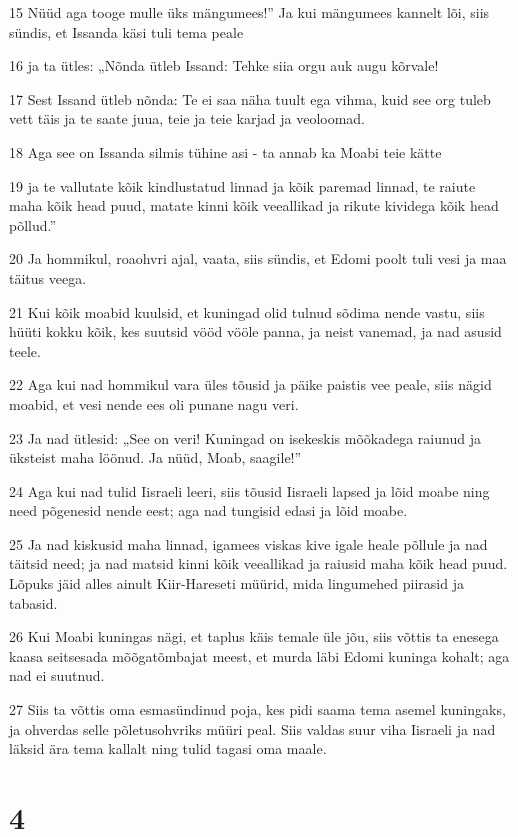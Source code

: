 \par 15 Nüüd aga tooge mulle üks mängumees!” Ja kui mängumees kannelt lõi, siis sündis, et Issanda käsi tuli tema peale
\par 16 ja ta ütles: „Nõnda ütleb Issand: Tehke siia orgu auk augu kõrvale!
\par 17 Sest Issand ütleb nõnda: Te ei saa näha tuult ega vihma, kuid see org tuleb vett täis ja te saate juua, teie ja teie karjad ja veoloomad.
\par 18 Aga see on Issanda silmis tühine asi - ta annab ka Moabi teie kätte
\par 19 ja te vallutate kõik kindlustatud linnad ja kõik paremad linnad, te raiute maha kõik head puud, matate kinni kõik veeallikad ja rikute kividega kõik head põllud.”
\par 20 Ja hommikul, roaohvri ajal, vaata, siis sündis, et Edomi poolt tuli vesi ja maa täitus veega.
\par 21 Kui kõik moabid kuulsid, et kuningad olid tulnud sõdima nende vastu, siis hüüti kokku kõik, kes suutsid vööd vööle panna, ja neist vanemad, ja nad asusid teele.
\par 22 Aga kui nad hommikul vara üles tõusid ja päike paistis vee peale, siis nägid moabid, et vesi nende ees oli punane nagu veri.
\par 23 Ja nad ütlesid: „See on veri! Kuningad on isekeskis mõõkadega raiunud ja üksteist maha löönud. Ja nüüd, Moab, saagile!”
\par 24 Aga kui nad tulid Iisraeli leeri, siis tõusid Iisraeli lapsed ja lõid moabe ning need põgenesid nende eest; aga nad tungisid edasi ja lõid moabe.
\par 25 Ja nad kiskusid maha linnad, igamees viskas kive igale heale põllule ja nad täitsid need; ja nad matsid kinni kõik veeallikad ja raiusid maha kõik head puud. Lõpuks jäid alles ainult Kiir-Hareseti müürid, mida lingumehed piirasid ja tabasid.
\par 26 Kui Moabi kuningas nägi, et taplus käis temale üle jõu, siis võttis ta enesega kaasa seitsesada mõõgatõmbajat meest, et murda läbi Edomi kuninga kohalt; aga nad ei suutnud.
\par 27 Siis ta võttis oma esmasündinud poja, kes pidi saama tema asemel kuningaks, ja ohverdas selle põletusohvriks müüri peal. Siis valdas suur viha Iisraeli ja nad läksid ära tema kallalt ning tulid tagasi oma maale.

\chapter{4}

